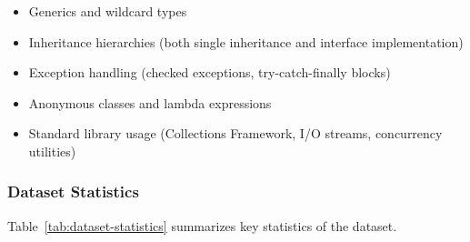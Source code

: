 \begin{itemize}
\item Generics and wildcard types
\item Inheritance hierarchies (both single inheritance and interface implementation)
\item Exception handling (checked exceptions, try-catch-finally blocks)
\item Anonymous classes and lambda expressions
\item Standard library usage (Collections Framework, I/O streams, concurrency utilities)
\end{itemize}

\subsubsection{Dataset Statistics}

Table~\ref{tab:dataset-statistics} summarizes key statistics of the dataset.

